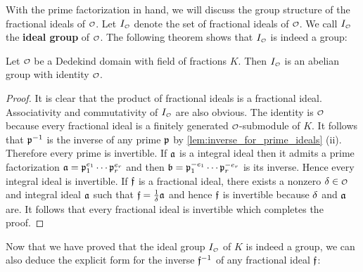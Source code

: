     With the prime factorization in hand, we will discuss the group structure of the fractional ideals of $\smc{O}$. Let $I_{\smc{O}}$ denote the set of fractional ideals of $\smc{O}$. We call $I_{\smc{O}}$ the \textbf{ideal group} of $\smc{O}$. The following theorem shows that $I_{\smc{O}}$ is indeed a group:

    \begin{theorem}\label{thm:ideal_group_is_a_group}
      Let $\smc{O}$ be a Dedekind domain with field of fractions $K$. Then $I_{\smc{O}}$ is an abelian group with identity $\smc{O}$.
    \end{theorem}
    \begin{proof}
      It is clear that the product of fractional ideals is a fractional ideal. Associativity and commutativity of $I_{\smc{O}}$ are also obvious. The identity is $\smc{O}$ because every fractional ideal is a finitely generated $\smc{O}$-submodule of $K$. It follows that $\mathfrak{p}^{-1}$ is the inverse of any prime $\mathfrak{p}$ by \cref{lem:inverse_for_prime_ideals} (ii). Therefore every prime is invertible. If $\mathfrak{a}$ is a integral ideal then it admits a prime factorization $\mathfrak{a} = \mathfrak{p}_{1}^{e_{1}} \cdots \mathfrak{p}_{r}^{e_{r}}$ and then $\mathfrak{b} = \mathfrak{p}_{1}^{-e_{1}} \cdots \mathfrak{p}_{r}^{-e_{r}}$ is its inverse. Hence every integral ideal is invertible. If $\mathfrak{f}$ is a fractional ideal, there exists a nonzero $\d \in \smc{O}$ and integral ideal $\mathfrak{a}$ such that $\mathfrak{f} = \frac{1}{\delta}\mathfrak{a}$ and hence $\mathfrak{f}$ is invertible because $\delta$ and $\mathfrak{a}$ are. It follows that every fractional ideal is invertible which completes the proof.
    \end{proof}

    Now that we have proved that the ideal group $I_{\smc{O}}$ of $K$ is indeed a group, we can also deduce the explicit form for the inverse $\mathfrak{f}^{-1}$ of any fractional ideal $\mathfrak{f}$:

